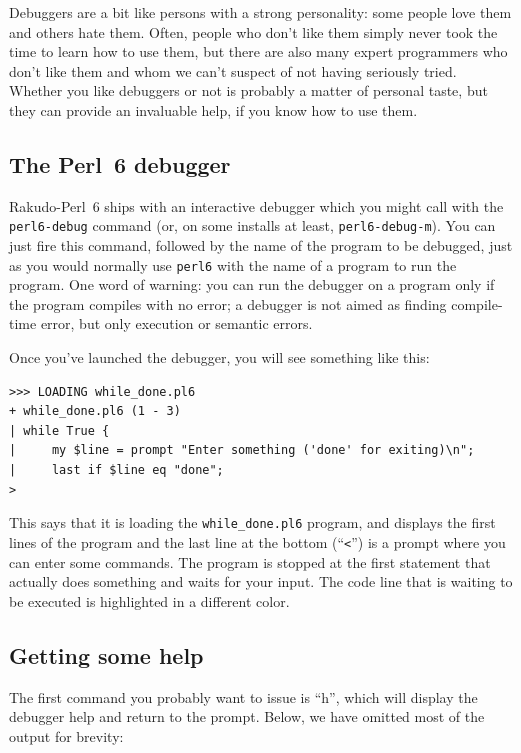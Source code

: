 Debuggers are a bit like persons with a strong personality: 
some people love them and others hate them. Often, people 
who don't like them simply never took the time to learn 
how to use them, but there are also many expert programmers 
who don't like them and whom we can't suspect of not having 
seriously tried. Whether you like debuggers or not is 
probably a matter of personal taste, but they can provide an 
invaluable help, if you know how to use them.

\subsection{The Perl~6 debugger}

Rakudo-Perl~6 ships with an interactive debugger which 
you might call with the {\tt perl6-debug} command (or, on 
some installs at least, {\tt perl6-debug-m}). You can 
just fire this command, followed by the name of the program 
to be debugged, just as you would normally use {\tt perl6} with 
the name of a program to run the program. One word of 
warning: you can run the debugger on a program only if 
the program compiles with no error; a debugger is not 
aimed as finding compile-time error, but only execution 
or semantic errors.

Once you've launched the debugger, you will see something 
like this:

\begin{verbatim}
>>> LOADING while_done.pl6
+ while_done.pl6 (1 - 3)
| while True {
|     my $line = prompt "Enter something ('done' for exiting)\n";
|     last if $line eq "done";
>
\end{verbatim}

This says that it is loading the \verb'while_done.pl6' program, 
and displays the first lines of the program and the last line at 
the bottom (``\verb"<"'') is a prompt where you can enter some 
commands. The program 
is stopped at the first statement that actually does something 
and waits for your input. The code line that is waiting to be 
executed is highlighted in a different color.

\subsection{Getting some help}

The first command you probably want to issue is ``h'', which 
will display the debugger help and return to the prompt. 
Below, we have omitted most of the output for brevity:

